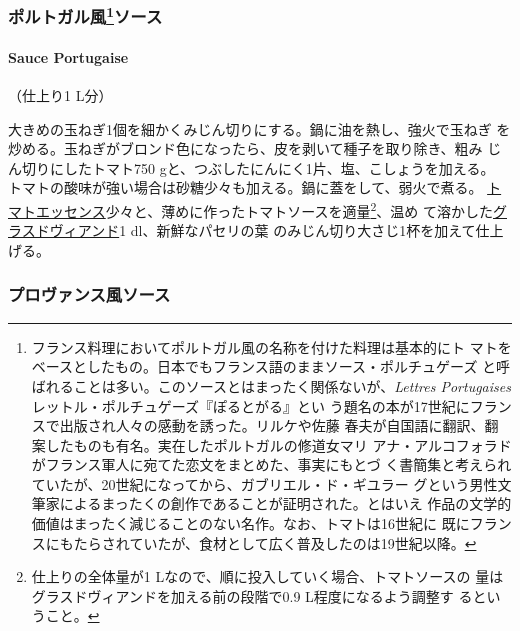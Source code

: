 \begin{recette}
{\subsubsection[ポルトガル風ソース]{\texorpdfstring{ポルトガル風\footnote{フランス料理においてポルトガル風の名称を付けた料理は基本的にト
  マトをベースとしたもの。日本でもフランス語のままソース・ポルチュゲーズ
  と呼ばれることは多い。このソースとはまったく関係ないが、\emph{Lettres
  Portugaises} レットル・ポルチュゲーズ『ぽるとがる』とい
  う題名の本が17世紀にフランスで出版され人々の感動を誘った。リルケや佐藤
  春夫が自国語に翻訳、翻案したものも有名。実在したポルトガルの修道女マリ
  アナ・アルコフォラドがフランス軍人に宛てた恋文をまとめた、事実にもとづ
  く書簡集と考えられていたが、20世紀になってから、ガブリエル・ド・ギユラー
  グという男性文筆家によるまったくの創作であることが証明された。とはいえ
  作品の文学的価値はまったく減じることのない名作。なお、トマトは16世紀に
  既にフランスにもたらされていたが、食材として広く普及したのは19世紀以降。}ソース}{ポルトガル風ソース}}\label{ux30ddux30ebux30c8ux30acux30ebux98a873ux30bdux30fcux30b9}}

\hypertarget{sauce-portugaise}{%
\paragraph{Sauce Portugaise}\label{sauce-portugaise}}

   

（仕上り1 L分）

大きめの玉ねぎ1個を細かくみじん切りにする。鍋に油を熱し、強火で玉ねぎ
を炒める。玉ねぎがブロンド色になったら、皮を剥いて種子を取り除き、粗み
じん切りにしたトマト750 gと、つぶしたにんにく1片、塩、こしょうを加える。
トマトの酸味が強い場合は砂糖少々も加える。鍋に蓋をして、弱火で煮る。
\href{}{トマトエッセンス}少々と、薄めに作ったトマトソースを適量\footnote{仕上りの全体量が1
  Lなので、順に投入していく場合、トマトソースの
  量はグラスドヴィアンドを加える前の段階で0.9 L程度になるよう調整す
  るということ。}、温め
て溶かした\protect\hyperlink{glace-de-viande}{グラスドヴィアンド}1
dl、新鮮なパセリの葉 のみじん切り大さじ1杯を加えて仕上げる。

\maeaki

\hypertarget{ux30d7ux30edux30f4ux30a1ux30f3ux30b9ux98a8ux30bdux30fcux30b9}{%
\subsubsection{プロヴァンス風ソース}\label{ux30d7ux30edux30f4ux30a1ux30f3ux30b9ux98a8ux30bdux30fcux30b9}}


\end{recette}
